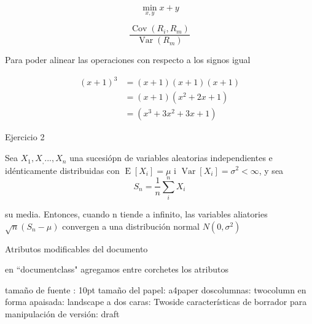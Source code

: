 \documentclass[12pt, landscape,letterpaper]{article}
\begin{document}
\begin{equation*}
	\min_{x,y}{x+y}
\end{equation*}


\begin{equation*}
	\frac{\operatorname{Cov}(R_i, R_m)}{\operatorname{Var}(R_m)}
\end{equation*}


Para poder alinear las operaciones con respecto a los signos igual

\begin{align*}
	(x+1)^3 &=(x+1)(x+1)(x+1)\\
			&=(x+1)(x^2+2x+1)\\
			&=(x^3+3x^2+3x+1)
\end{align*}

Ejercicio 2

Sea $X_1,X_,...,X_n$ una sucesiópn de variables aleatorias independientes e idénticamente distribuidas con $\operatorname{E}[X_i]=\mu$ i $\operatorname{Var}[X_i]=\sigma^2 < \infty$, y sea
\begin{equation*}
	S_n=\frac{1}{n}\sum_{i}^{n}X_i
\end{equation*}

su media. Entonces, cuando n tiende a infinito, las variables aliatories $\sqrt{n}(S_n-\mu)$ convergen a una distribución normal $N(0,\sigma^2)$

Atributos modificables del documento

en ``documentclass" agregamos entre corchetes los atributos

tamaño de fuente : 10pt
tamaño del papel:	a4paper
doscolumnas:	twocolumn
en forma apaisada:	landscape
a dos caras:	Twoside
características de borrador para manipulación de versión: draft
\end{document}
